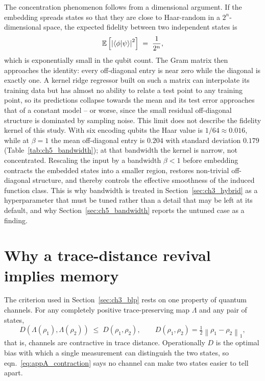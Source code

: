 The concentration phenomenon follows from a dimensional argument. If the embedding
spreads states so that they are close to Haar-random in a $2^n$-dimensional space,
the expected fidelity between two independent states is
\begin{equation}
    \mathbb{E}\left[ \left| \braket{\phi | \psi} \right|^{2} \right]
    \;=\; \frac{1}{2^{n}},
    \label{eq:appA_haar}
\end{equation}
which is exponentially small in the qubit count. The Gram matrix then approaches the
identity: every off-diagonal entry is near zero while the diagonal is exactly one.
A kernel ridge regressor built on such a matrix can interpolate its training data
but has almost no ability to relate a test point to any training point, so its
predictions collapse towards the mean and its test error approaches that of a
constant model -- or worse, since the small residual off-diagonal structure is
dominated by sampling noise. This limit does not describe the fidelity kernel of this
study. With six encoding qubits the Haar value is $1/64 \approx 0.016$, while at
$\beta = 1$ the mean off-diagonal entry is $0.204$ with standard deviation $0.179$
(Table~\ref{tab:ch5_bandwidth}); at that bandwidth the kernel is narrow, not
concentrated. Rescaling the input by a bandwidth
$\beta < 1$ before embedding contracts the embedded states into a smaller region,
restores non-trivial off-diagonal structure, and thereby controls the effective
smoothness of the induced function class. This is why bandwidth is treated in
Section~\ref{sec:ch3_hybrid} as a hyperparameter that must be tuned rather than a
detail that may be left at its default, and why
Section~\ref{sec:ch5_bandwidth} reports the untuned case as a finding.

\section{Why a trace-distance revival implies memory}
\label{sec:appA_blp}

The criterion used in Section~\ref{sec:ch3_blp} rests on one property of quantum
channels. For any completely positive trace-preserving map $\Lambda$ and any pair of
states,
\begin{equation}
    D\!\left( \Lambda(\rho_1), \Lambda(\rho_2) \right)
    \;\leq\; D\!\left( \rho_1, \rho_2 \right),
    \qquad
    D(\rho_1, \rho_2) = \tfrac{1}{2}\left\| \rho_1 - \rho_2 \right\|_1,
    \label{eq:appA_contraction}
\end{equation}
that is, channels are contractive in trace distance. Operationally $D$ is the
optimal bias with which a single measurement can distinguish the two states, so
eqn.~\eqref{eq:appA_contraction} says no channel can make two states easier to tell
apart.


